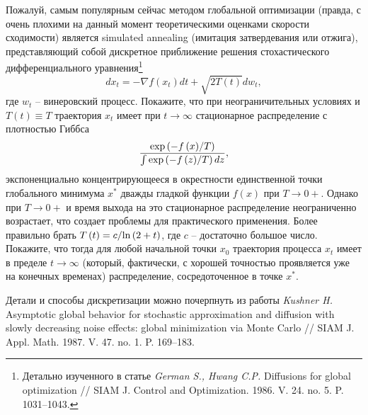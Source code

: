  \begin{problem}
 \label{annealing}
 Пожалуй, самым популярным сейчас методом глобальной оптимизации (правда, с очень 
плохими на данный момент теоретическими оценками скорости сходимости) 
является simulated annealing (имитация затвердевания или отжига), 
представляющий собой дискретное приближение решения стохастического 
дифференциального уравнения\footnote{ Детально изученного в статье \textit{German S., Hwang C.P.} 
Diffusions for global optimization // SIAM J. Control and Optimization. 
1986. V. 24. no. 5. P. 1031--1043.}
\[
dx_t =-\nabla f\left( {x_t } \right)dt+\sqrt {2T\left( t \right)} dw_t ,
\]
где $w_t $ -- винеровский процесс. Покажите, что при неограничительных 
условиях и $T\left( t \right)\equiv T$ траектория $x_t $ имеет при $t\to 
\infty $ стационарное распределение с плотностью Гиббса
\[
\frac{\exp \left( {-{f\left( x \right)} \mathord{\left/ {\vphantom {{f\left( 
x \right)} T}} \right. \kern-\nulldelimiterspace} T} \right)}{\int {\exp 
\left( {-{f\left( z \right)} \mathord{\left/ {\vphantom {{f\left( z \right)} 
T}} \right. \kern-\nulldelimiterspace} T} \right)dz} },
\]
экспоненциально концентрирующееся в окрестности единственной точки 
глобального минимума $x^\ast $ дважды гладкой функции $f\left( x \right)$ 
при $T\to 0+$. Однако при $T\to 0+$ и время выхода на это стационарное 
распределение неограниченно возрастает, что создает проблемы для 
практического применения. Более правильно брать $T\left( t \right)=c 
\mathord{\left/ {\vphantom {c {\ln \left( {2+t} \right)}}} \right. 
\kern-\nulldelimiterspace} {\ln \left( {2+t} \right)}$, где $c$ -- 
достаточно большое число. Покажите, что тогда для любой начальной точки $x_0 
$ траектория процесса $x_t $ имеет в пределе $t\to \infty $ (который, 
фактически, с хорошей точностью проявляется уже на конечных временах) 
распределение, сосредоточенное в точке $x^\ast $. 

\end{problem}

\begin{remark} 
Детали и способы дискретизации можно почерпнуть из 
работы \textit{Kushner H.} Asymptotic global behavior for stochastic approximation and 
diffusion with slowly decreasing noise effects: global minimization via 
Monte Carlo // SIAM J. Appl. Math. 1987. V. 47. no. 1. P. 169--183.
\end{remark}


